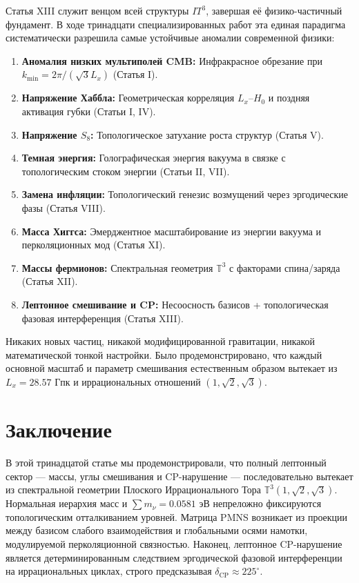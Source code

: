 \documentclass[12pt,a4paper]{article}
\begin{document}
Статья XIII служит венцом всей структуры $IT^3$, завершая её физико-частичный фундамент. В ходе тринадцати специализированных работ эта единая парадигма систематически разрешила самые устойчивые аномалии современной физики:
\begin{enumerate}
    \item \textbf{Аномалия низких мультиполей CMB:} Инфракрасное обрезание при $k_{\min} = 2\pi/(\sqrt{3}L_x)$ (Статья I).
    \item \textbf{Напряжение Хаббла:} Геометрическая корреляция $L_x$--$H_0$ и поздняя активация губки (Статьи I, IV).
    \item \textbf{Напряжение $S_8$:} Топологическое затухание роста структур (Статья V).
    \item \textbf{Темная энергия:} Голографическая энергия вакуума в связке с топологическим стоком энергии (Статьи II, VII).
    \item \textbf{Замена инфляции:} Топологический генезис возмущений через эргодические фазы (Статья VIII).
    \item \textbf{Масса Хиггса:} Эмерджентное масштабирование из энергии вакуума и перколяционных мод (Статья XI).
    \item \textbf{Массы фермионов:} Спектральная геометрия $\mathbb{T}^3$ с факторами спина/заряда (Статья XII).
    \item \textbf{Лептонное смешивание и CP:} Несоосность базисов + топологическая фазовая интерференция (Статья XIII).
\end{enumerate}
Никаких новых частиц, никакой модифицированной гравитации, никакой математической тонкой настройки. Было продемонстрировано, что каждый основной масштаб и параметр смешивания естественным образом вытекает из $L_x = 28.57$ Гпк и иррациональных отношений $(1, \sqrt{2}, \sqrt{3})$.

\section{Заключение}
В этой тринадцатой статье мы продемонстрировали, что полный лептонный сектор — массы, углы смешивания и CP-нарушение — последовательно вытекает из спектральной геометрии Плоского Иррационального Тора $\mathbb{T}^3(1,\sqrt{2},\sqrt{3})$. Нормальная иерархия масс и $\sum m_\nu = 0.0581$ эВ непреложно фиксируются топологическим отталкиванием уровней. Матрица PMNS возникает из проекции между базисом слабого взаимодействия и глобальными осями намотки, модулируемой перколяционной связностью. Наконец, лептонное CP-нарушение является детерминированным следствием эргодической фазовой интерференции на иррациональных циклах, строго предсказывая $\delta_{\text{CP}} \approx 225^\circ$.
\end{document}
